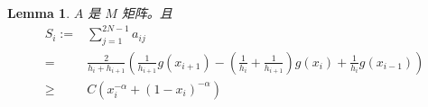 \documentclass{ctexart}
\newtheorem{lemma}[theorem]{Lemma}
\theoremstyle{definition}
\theoremstyle{remark}
\numberwithin{equation}{section}
\begin{document}
\begin{lemma}\label{lmm:AisM}
    \(A\) 是 \(M\) 矩阵。且
    \begin{equation}
        \begin{aligned}
            S_i := & \sum_{j=1}^{2N-1}a_{ij}                                                                                                                        \\
            =      & \frac{2}{h_i + h_{i+1}} \left( \frac{1}{h_{i+1}} g(x_{i+1}) - (\frac{1}{h_{i}}+\frac{1}{h_{i+1}})g(x_{i}) + \frac{1}{h_{i}} g(x_{i-1}) \right) \\
            \ge    & C (x_i^{-\alpha} + (1-x_i)^{-\alpha})
        \end{aligned}
    \end{equation}
\end{lemma}
\end{document}
